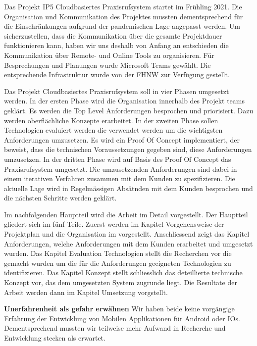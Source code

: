 Das Projekt IP5 Cloudbasiertes Praxisrufsystem startet im Frühling 2021.
Die Organisation und Kommunikation des Projektes mussten dementsprechend für die Einschränkungen aufgrund der pandemischen Lage angepasst werden.
Um sicherzustellen, dass die Kommunikation über die gesamte Projektdauer funktionieren kann, haben wir uns deshalb von Anfang an entschieden die Kommunikation über Remote- und Online Tools zu organisieren.
Für Besprechungen und Planungen wurde Microsoft Teams gewählt.
Die entsprechende Infrastruktur wurde von der FHNW zur Verfügung gestellt.

Das Projekt Cloudbasiertes Praxisrufsystem soll in vier Phasen umgesetzt werden.
In der ersten Phase wird die Organisation innerhalb des Projekt teams geklärt.
Es werden die Top Level Anforderungen besprochen und priorisiert.
Dazu werden oberflächliche Konzepte erarbeitet.
In der zweiten Phase sollen Technologien evaluiert werden die verwendet werden um die wichtigsten Anforderungen umzusetzen.
Es wird ein Proof Of Concept implementiert, der beweist, dass die technischen Voraussetzungen gegeben sind, diese Anforderungen umzusetzen.
In der dritten Phase wird auf Basis des Proof Of Concept das Praxisrufsystem umgesetzt.
Die umzusetzenden Anforderungen sind dabei in einem iterativen Verfahren zusammen mit dem Kunden zu spezifizieren.
Die aktuelle Lage wird in Regelmässigen Absätnden mit dem Kunden besprochen und die nächsten Schritte werden geklärt.

Im nachfolgenden Hauptteil wird die Arbeit im Detail vorgestellt.
Der Hauptteil gliedert sich im fünf Teile.
Zuerst werden im Kapitel Vorgehensweise der Projektplan und die Organisation im vorgestellt.
Anschliessend zeigt das Kapitel Anforderungen, welche Anforderungen mit dem Kunden erarbeitet und umgesetzt wurden.
Das Kapitel Evaluation Technologien stellt die Recherchen vor die gemacht wurden um die für die Anforderungen geeigneten Technologien zu identifizieren.
Das Kapitel Konzept stellt schliesslich das deteillierte technische Konzept vor, das dem umgesetzten System zugrunde liegt.
Die Resultate der Arbeit werden dann im Kapitel Umsetzung vorgstellt.


\textbf{Unerfahrenheit als gefahr erwähnen}
Wir haben beide keine vorgängige Erfahrung der Entwicklung von Mobilen Applikationen für Android oder IOs.
Dementsprechend mussten wir teilweise mehr Aufwand in Recherche und Entwicklung stecken als erwartet.

\clearpage
